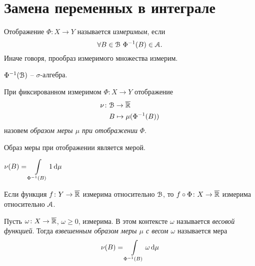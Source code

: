 \section{Замена переменных в интеграле}

\begin{definition}
    
    Отображение $\Phi \colon X \to Y$ называется \textit{измеримым}, если
\[
    \forall B \in \mathcal{B}~ \Phi^{-1}(B) \in \mathcal{A}
.\] 
    Иначе говоря, прообраз измеримого множества измерим.
\end{definition}

\begin{lemma}
    $\Phi^{-1}(\mathcal{B})$ -- $\sigma$-алгебра.
\end{lemma}

\begin{definition}
    При фиксированном измеримом $\Phi \colon X \to Y$ отображение
    \begin{align*}
        \nu \colon &\mathcal{B} \to \overline{\mathbb{R}} \\ 
                   &B \mapsto \mu(\Phi^{-1}(B))
    \end{align*}
    назовем \textit{образом меры $\mu$ при отображении} $\Phi$.
\end{definition}

\begin{lemma}
    Образ меры при отображении является мерой.
\end{lemma}

\begin{remark}
    $\displaystyle \nu(B) = \int\limits_{\Phi^{-1}(B)}{1 \,\mathrm{d}\mu}$
\end{remark}

\begin{remark}
    Если функция $f \colon Y \to \overline{\mathbb{R}}$ измерима относительно $\mathcal{B}$, 
    то $f \circ \Phi \colon X \to \overline{\mathbb{R}}$ измерима относительно $\mathcal{A}$.
\end{remark}

\begin{definition}
    Пусть $\omega \colon X \to \overline{\mathbb{R}}$, $\omega \geqslant 0$, измерима.
    В этом контексте $\omega$ называется \textit{весовой функцией}. Тогда
    \textit{взвешенным образом меры $\mu$ с весом $\omega$} называется мера
    \begin{align*}
        \nu(B) = \int\limits_{\Phi^{-1}(B)}{\omega \,\mathrm{d}\mu}    
    \end{align*}
\end{definition}

